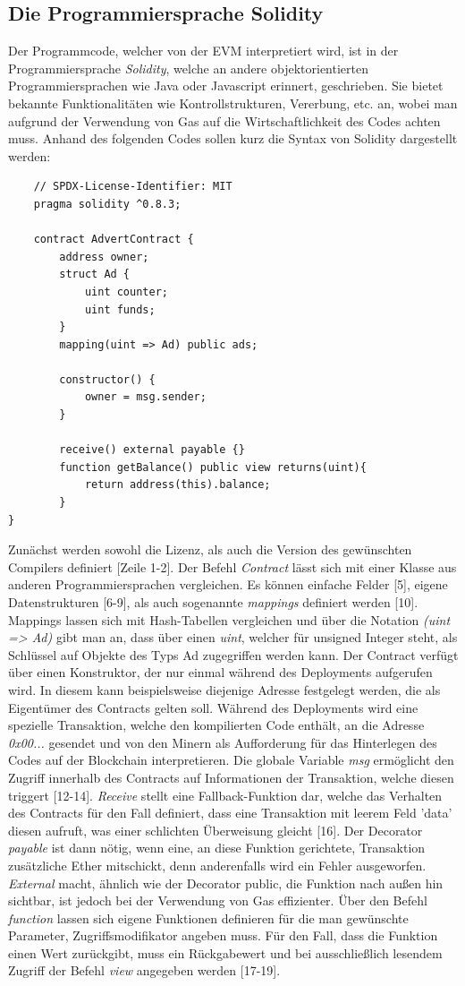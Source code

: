 \subsection{Die Programmiersprache Solidity}
Der Programmcode, welcher von der EVM interpretiert wird, ist in der Programmiersprache \emph{Solidity}, welche an andere objektorientierten Programmiersprachen wie Java oder Javascript erinnert, geschrieben. Sie bietet bekannte Funktionalitäten wie Kontrollstrukturen, Vererbung, etc. an, wobei man aufgrund der Verwendung von Gas auf die Wirtschaftlichkeit des Codes achten muss. Anhand des folgenden Codes sollen kurz die Syntax von Solidity dargestellt werden: 
\begin{lstlisting}
	// SPDX-License-Identifier: MIT
	pragma solidity ^0.8.3;
	
	contract AdvertContract {
		address owner;
		struct Ad {
			uint counter;
			uint funds;
		}
		mapping(uint => Ad) public ads;
		
		constructor() {
			owner = msg.sender;
		}
	
		receive() external payable {}
		function getBalance() public view returns(uint){
			return address(this).balance;
		}
}
	\end{lstlisting}
Zunächst werden sowohl die Lizenz, als auch die Version des gewünschten Compilers definiert [Zeile 1-2]. Der Befehl \emph{Contract} lässt sich mit einer Klasse aus anderen Programmiersprachen vergleichen. 
Es können einfache Felder [5], eigene Datenstrukturen [6-9], als auch sogenannte \emph{mappings} definiert werden [10]. Mappings lassen sich mit Hash-Tabellen vergleichen und über die Notation \emph{(uint => Ad)} gibt man an, dass über einen \emph{uint}, welcher für unsigned Integer steht, als Schlüssel auf Objekte des Typs Ad zugegriffen werden kann. 
Der Contract verfügt über einen Konstruktor, der nur einmal während des Deployments aufgerufen wird. In diesem kann beispielsweise diejenige Adresse festgelegt werden, die als Eigentümer des Contracts gelten soll. 
Während des Deployments wird eine spezielle Transaktion, welche den kompilierten Code enthält, an die Adresse \emph{0x00...} gesendet und von den Minern als Aufforderung für das Hinterlegen des Codes auf der Blockchain interpretieren. 
Die globale Variable \emph{msg} ermöglicht den Zugriff innerhalb des Contracts auf Informationen der Transaktion, welche diesen triggert [12-14].
\emph{Receive} stellt eine Fallback-Funktion dar, welche das Verhalten des Contracts für den Fall definiert, dass eine Transaktion mit leerem Feld 'data' diesen aufruft, was einer schlichten Überweisung gleicht [16]. Der Decorator \emph{payable} ist dann nötig, wenn eine, an diese Funktion gerichtete, Transaktion zusätzliche Ether mitschickt, denn anderenfalls wird ein Fehler ausgeworfen. \emph{External} macht, ähnlich wie der Decorator public, die Funktion nach außen hin sichtbar, ist jedoch bei der Verwendung von Gas effizienter. Über den Befehl \emph{function} lassen sich eigene Funktionen definieren für die man gewünschte Parameter, Zugriffsmodifikator angeben muss. Für den Fall, dass die Funktion einen Wert zurückgibt, muss ein Rückgabewert und bei ausschließlich lesendem Zugriff der Befehl \emph{view} angegeben werden [17-19]. 
